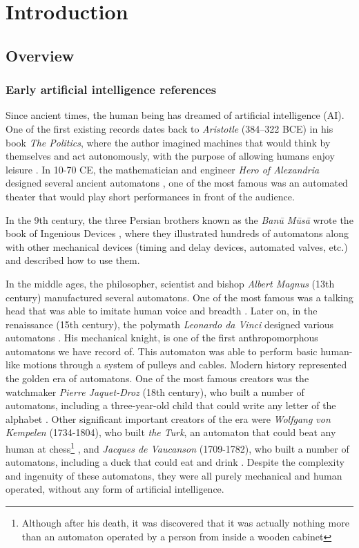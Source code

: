 \chapter{Introduction} \label{ch:introduction}
\section{Overview}
\subsection{Early artificial intelligence references}
Since ancient times, the human being has dreamed of artificial intelligence (AI). One of the first existing records dates back to \textit{Aristotle} (384–322 BCE) in his book \textit{The Politics}, where the author imagined machines that would think by themselves and act autonomously, with the purpose of allowing humans enjoy leisure \autocite{nils2009}. In 10-70 CE, the mathematician and engineer \textit{Hero of Alexandria} designed several ancient automatons \autocite{greenwood1851}, one of the most famous was an automated theater that would play short performances in front of the audience.

In the 9th century, the three Persian brothers known as the \textit{Banū Mūsā} wrote the book of Ingenious Devices \autocite{musa1978}, where they illustrated hundreds of automatons along with other mechanical devices (timing and delay devices, automated valves, etc.) and described how to use them. 

In the middle ages, the philosopher, scientist and bishop \textit{Albert Magnus} (13th century) manufactured several automatons. One of the most famous was a talking head that was able to imitate human voice and breadth \autocite{worthies1828}.
Later on, in the renaissance (15th century), the polymath \textit{Leonardo da Vinci} designed various automatons \autocite{nils2009}. His mechanical knight, is one of the first anthropomorphous automatons we have record of. This automaton was able to perform basic human-like motions through a system of pulleys and cables. 
Modern history represented the golden era of automatons. One of the most famous creators was the watchmaker \textit{Pierre Jaquet-Droz} (18th century), who built a number of automatons, including a three-year-old child that could write any letter of the alphabet \autocite{carrera1979}.
Other significant important creators of the era were \textit{Wolfgang von Kempelen} (1734-1804), who built \textit{the Turk}, an automaton that could beat any human at chess\footnote{Although after his death, it was discovered that it was actually nothing more than an automaton operated by a person from inside a wooden cabinet } \autocite{jay2000}, 
and \textit{Jacques de Vaucanson} (1709-1782), who built a number of automatons, including a duck that could eat and drink \autocite{nils2009, trymbaka2022}. Despite the complexity and ingenuity of these automatons, they were all purely mechanical and human operated, without any form of artificial intelligence.

